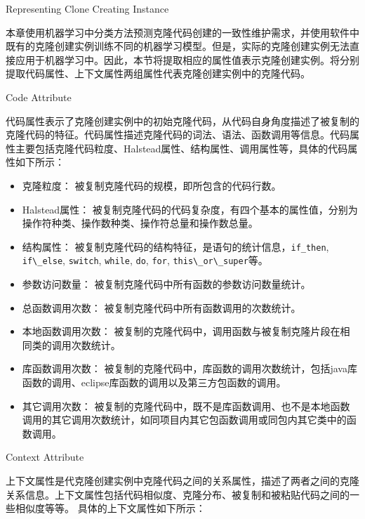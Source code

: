 {Representing Clone Creating Instance}
\label{lab-creatingattribute}

本章使用机器学习中分类方法预测克隆代码创建的一致性维护需求，并使用软件中既有的克隆创建实例训练不同的机器学习模型。但是，实际的克隆创建实例无法直接应用于机器学习中。因此，本节将提取相应的属性值表示克隆创建实例。将分别提取代码属性、上下文属性两组属性代表克隆创建实例中的克隆代码。

{Code Attribute}

代码属性表示了克隆创建实例中的初始克隆代码，从代码自身角度描述了被复制的克隆代码的特征。代码属性描述克隆代码的词法、语法、函数调用等信息。代码属性主要包括克隆代码粒度、Halstead属性、结构属性、调用属性等，具体的代码属性如下所示：

\begin{itemize}
\item 
克隆粒度：
被复制克隆代码的规模，即所包含的代码行数。
\item 
Halstead属性：
被复制克隆代码的代码复杂度，有四个基本的属性值，分别为操作符种类、操作数种类、操作符总量和操作数总量。
\item  
结构属性：
被复制克隆代码的结构特征，是语句的统计信息，\verb+if_then+, \verb+if\_else+, \verb+switch+, \verb+while+, \verb+do+, \verb+for+,  \verb+this\_or\_super+等。
\item  
参数访问数量：
被复制克隆代码中所有函数的参数访问数量统计。
\item  
总函数调用次数：
被复制克隆代码中所有函数调用的次数统计。
\item  
本地函数调用次数：
被复制的克隆代码中，调用函数与被复制克隆片段在相同类的调用次数统计。
\item  
库函数调用次数：
被复制的克隆代码中，库函数的调用次数统计，包括java库函数的调用、eclipse库函数的调用以及第三方包函数的调用。
\item  
其它调用次数：
被复制的克隆代码中，既不是库函数调用、也不是本地函数调用的其它调用次数统计，如同项目内其它包函数调用或同包内其它类中的函数调用。
\end{itemize}

{Context Attribute}

上下文属性是代克隆创建实例中克隆代码之间的关系属性，描述了两者之间的克隆关系信息。上下文属性包括代码相似度、克隆分布、被复制和被粘贴代码之间的一些相似度等等。
具体的上下文属性如下所示：

